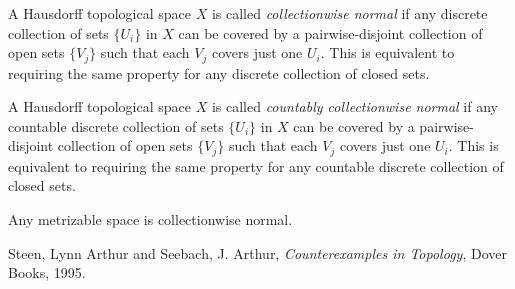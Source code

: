 \documentclass[12pt]{article}
\newcommand{\<}{\langle}
\renewcommand{\>}{\rangle}
\begin{document}
A Hausdorff topological space $X$ is called \emph{collectionwise normal} if any discrete collection of sets $\{U_i\}$ in $X$ can be covered by a pairwise-disjoint collection of open sets $\{V_j\}$ such that each $V_j$ covers just one $U_i$.  This is equivalent to requiring the same property for any discrete collection of closed sets.

A Hausdorff topological space $X$ is called \emph{countably collectionwise normal} if any countable discrete collection of sets $\{U_i\}$ in $X$ can be covered by a pairwise-disjoint collection of open sets $\{V_j\}$ such that each $V_j$ covers just one $U_i$.  This is equivalent to requiring the same property for any countable discrete collection of closed sets.

Any metrizable space is collectionwise normal.

\begin{thebibliography}{9}
Steen, Lynn Arthur and Seebach, J. Arthur, \emph{Counterexamples in Topology}, Dover Books, 1995.
\end{thebibliography}
\end{document}
